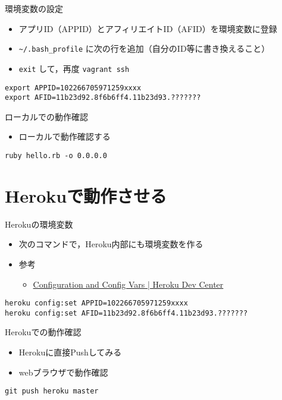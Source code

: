\documentclass[t]{beamer}
\begin{document}
\begin{frame}[fragile,label=sec-1-4]{環境変数の設定}
 \begin{itemize}
\item アプリID（APPID）とアフィリエイトID（AFID）を環境変数に登録
\item \texttt{\textasciitilde{}/.bash\_profile} に次の行を追加（自分のID等に書き換えること）
\item \texttt{exit} して，再度 \texttt{vagrant ssh}
\end{itemize}

\begin{verbatim}
export APPID=102266705971259xxxx
export AFID=11b23d92.8f6b6ff4.11b23d93.???????
\end{verbatim}
\end{frame}

\begin{frame}[fragile,label=sec-1-5]{ローカルでの動作確認}
 \begin{itemize}
\item ローカルで動作確認する
\end{itemize}

\begin{verbatim}
ruby hello.rb -o 0.0.0.0
\end{verbatim}
\end{frame}

\section{Herokuで動作させる}
\label{sec-2}
\begin{frame}[fragile,label=sec-2-1]{Herokuの環境変数}
 \begin{itemize}
\item 次のコマンドで，Heroku内部にも環境変数を作る
\item 参考
\begin{itemize}
\item \href{https://devcenter.heroku.com/articles/config-vars}{Configuration and Config Vars | Heroku Dev Center}
\end{itemize}
\end{itemize}

\begin{verbatim}
heroku config:set APPID=102266705971259xxxx
heroku config:set AFID=11b23d92.8f6b6ff4.11b23d93.???????
\end{verbatim}
\end{frame}

\begin{frame}[fragile,label=sec-2-2]{Herokuでの動作確認}
 \begin{itemize}
\item Herokuに直接Pushしてみる
\item webブラウザで動作確認
\end{itemize}

\begin{verbatim}
git push heroku master
\end{verbatim}
\end{frame}
\end{document}
